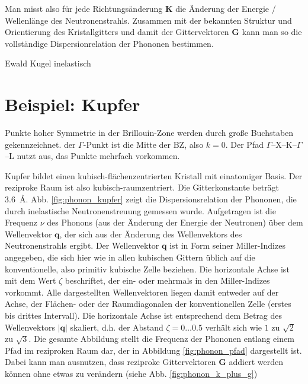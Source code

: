 Man misst also für jede Richtungsänderung $\mathbf{K}$ die Änderung der Energie / Wellenlänge des Neutronenstrahls. Zusammen mit der bekannten Struktur und Orientierung des Kristallgitters und damit der Gittervektoren $\mathbf{G}$ kann man so die vollständige Dispersionrelation der Phononen bestimmen.

\begin{marginfigure}
\caption{Ewald Kugel inelastisch}
\end{marginfigure}




\newpage

\section{Beispiel: Kupfer}




\begin{marginfigure}
\caption{Punkte hoher Symmetrie in der Brillouin-Zone werden durch große Buchstaben gekennzeichnet. der $\Gamma$-Punkt ist die Mitte der BZ, also $k=0$. Der Pfad $\Gamma$--X--K--$\Gamma$--L nutzt aus, das Punkte mehrfach  vorkommen. \label{fig:phonon_pfad} }
\end{marginfigure}


Kupfer bildet einen kubisch-flächenzentrierten Kristall mit einatomiger Basis. Der reziproke Raum ist also kubisch-raumzentriert. Die Gitterkonstante beträgt 3.6~\AA. Abb. \ref{fig:phonon_kupfer} zeigt die Dispersionsrelation der Phononen, die durch inelastische Neutronenstreuung gemessen wurde. Aufgetragen ist die Frequenz $\nu$ des Phonons (aus der Änderung der Energie der Neutronen) über dem Wellenvektor $\mathbf{q}$, der sich aus der Änderung des Wellenvektors des Neutronenstrahls ergibt. 
Der Wellenvektor  $\mathbf{q}$  ist in Form seiner Miller-Indizes angegeben, die sich hier wie  in allen kubischen  Gittern üblich auf die konventionelle, also primitiv kubische  Zelle  beziehen. Die horizontale Achse ist mit dem Wert  $\zeta$  beschriftet, der ein- oder mehrmals in den Miller-Indizes vorkommt. Alle dargestellten Wellenvektoren liegen damit entweder auf der Achse, der 
Flächen- oder der  Raumdiagonalen der konventionellen Zelle (erstes bis drittes Intervall). Die horizontale Achse ist entsprechend dem Betrag des Wellenvektors 
 $|\mathbf{q}|$ skaliert, d.h. der Abstand $\zeta = 0 \dots 0.5$ verhält sich wie $1$ zu $\sqrt{2}$ zu $\sqrt{3}$. Die gesamte Abbildung stellt die Frequenz der Phononen entlang einem Pfad im reziproken Raum dar, der in Abbildung \ref{fig:phonon_pfad}  dargestellt ist. Dabei kann man ausnutzen, dass reziproke Gittervektoren $\mathbf{G}$ addiert werden können ohne etwas  zu verändern (siehe Abb. \ref{fig:phonon_k_plus_g})
 
